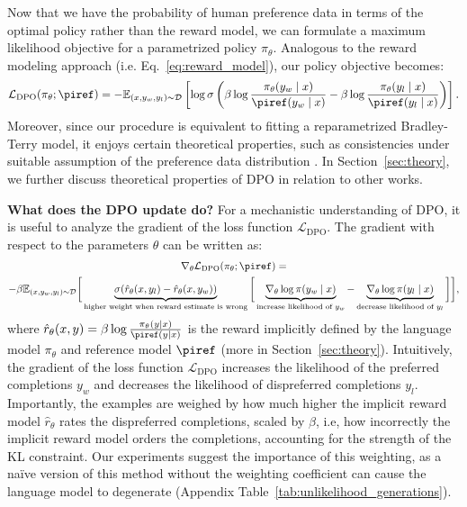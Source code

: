Now that we have 
the probability of human preference data in terms of the optimal policy rather than the reward model, we can formulate a maximum likelihood objective for a parametrized policy $\pi_\theta$. Analogous to the reward modeling approach (i.e. Eq.~\ref{eq:reward_model}), our policy objective becomes:
\begin{equation}\label{eq:optimum_model}
    \mathcal{L}_\text{DPO}(\pi_{\theta}; \piref) = -\mathbb{E}_{(x, y_w, y_l)\sim \mathcal{D}}\left[\log \sigma \left(\beta \log \frac{\pi_{\theta}(y_w\mid x)}{\piref(y_w\mid x)} - \beta \log \frac{\pi_{\theta}(y_l\mid x)}{\piref(y_l\mid x)}\right)\right].
\end{equation}
 Moreover, since our procedure is equivalent to fitting a reparametrized Bradley-Terry model, it enjoys certain theoretical properties, such as consistencies under suitable assumption of the preference data distribution \cite{bong2022generalized}. In Section~\ref{sec:theory}, we further discuss theoretical properties of DPO in relation to other works.

\textbf{What does the DPO update do?} For a mechanistic understanding of DPO, it is useful to analyze the gradient of the loss function $\mathcal{L}_\text{DPO}$. The gradient with respect to the parameters $\theta$ can be written as:
\begin{multline*}\label{eq:gradient}
    \nabla_\theta \mathcal{L}_\text{DPO}(\pi_\theta;\piref) = \\ -\beta\mathbb{E}_{(x, y_w, y_l) \sim \mathcal{D}} \bigg[\underbrace{\sigma(\hat{r}_\theta(x, y_l) - \hat{r}_\theta (x, y_w))}_\text{higher weight when reward estimate is wrong}\bigg[\underbrace{\nabla_\theta\log \pi(y_w \mid x)}_\text{increase likelihood of $y_w$} - \underbrace{\nabla_\theta\log\pi(y_l \mid x)}_\text{decrease likelihood of $y_l$}\bigg]\bigg],
\end{multline*}
where $\hat{r}_\theta(x, y) = \beta \log \frac{\pi_\theta(y \mid x)}{\piref(y \mid x)}$ is the reward implicitly defined by the language model $\pi_\theta$ and reference model $\piref$ (more in Section~\ref{sec:theory}). Intuitively, the gradient of the loss function $\mathcal{L}_\text{DPO}$ increases the likelihood of the preferred completions $y_w$ and decreases the likelihood of dispreferred completions $y_l$. Importantly, the examples are weighed by how much higher the implicit reward model $\hat{r}_\theta$ rates the dispreferred completions, scaled by $\beta$, i.e, how incorrectly the implicit reward model orders the completions, accounting for the strength of the KL constraint. Our experiments suggest the importance of this weighting, as a na\"ive version of this method without the weighting coefficient can cause the language model to degenerate (Appendix Table~\ref{tab:unlikelihood_generations}).

